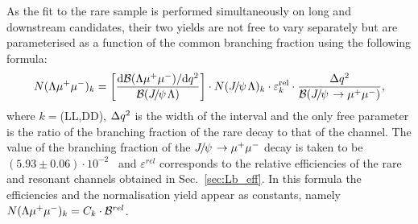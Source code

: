 \begin{table}
\centering
\caption{Predicted numbers of $\Bz\ra\KS\mumu$ events in each considered \qsq interval.}
\label{tab:KSprediction}
\end{table}

As the fit to the rare sample is performed simultaneously on long and downstream candidates,
their two yields are not free to vary separately but are parameterised
as a function of the common branching fraction using the following formula:
%
\begin{equation}
N(\Lz\mumu)_{k}  = \left[ \frac{\mathrm{d}\mathcal{B}(\Lz\mumu)/\mathrm{d}\qsq}{\mathcal{B}(\jpsi\Lz)} \right]  \cdot
N(\jpsi\Lz)_{k} \cdot \varepsilon^{\mathrm{rel}}_{k} \cdot \frac {\Delta\qsq} { \mathcal{B}(\jpsi\to\mumu) },
\label{eq:relYield}
\end{equation}
%
where $k = $(LL,DD), $\Delta q^2$ is the width of the \qsq interval and the only free parameter is the ratio of the branching 
fraction of the rare decay to that of the \jpsi channel. The value of the branching fraction of the $\jpsi\to\mumu$ decay is taken 
to be \mbox{$(5.93 \pm 0.06)\cdot 10^{-2}$~\cite{PDG2014}} and $\varepsilon^{rel}$ corresponds to
the relative efficiencies of the rare and resonant channels obtained in Sec.~\ref{sec:Lb_eff}. 
In this formula the efficiencies and the normalisation yield appear as constants, namely 
$N(\Lambda\mu^+\mu^-)_{k} = C_k \cdot \mathcal{B}^{rel}$. 


